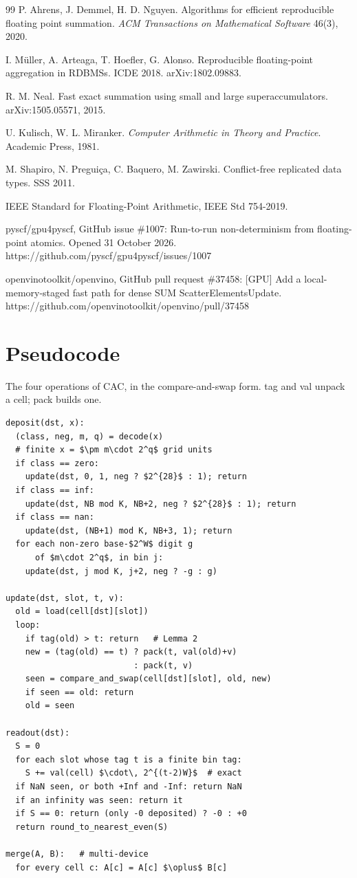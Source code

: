 \documentclass[3p,10pt]{elsarticle}
\begin{document}
\begin{thebibliography}{99}
 P. Ahrens, J. Demmel, H. D. Nguyen. Algorithms for efficient
reproducible floating point summation. \emph{ACM Transactions on
Mathematical Software} 46(3), 2020.

 I. Müller, A. Arteaga, T. Hoefler, G. Alonso. Reproducible
floating-point aggregation in RDBMSs. ICDE 2018. arXiv:1802.09883.

 R. M. Neal. Fast exact summation using small and large
superaccumulators. arXiv:1505.05571, 2015.

 U. Kulisch, W. L. Miranker. \emph{Computer Arithmetic in Theory and
Practice}. Academic Press, 1981.

 M. Shapiro, N. Preguiça, C. Baquero, M. Zawirski. Conflict-free
replicated data types. SSS 2011.

 IEEE Standard for Floating-Point Arithmetic, IEEE Std 754-2019.

 pyscf/gpu4pyscf, GitHub issue \#1007: Run-to-run non-determinism from
floating-point atomics. Opened 31 October 2026.
https://github.com/pyscf/gpu4pyscf/issues/1007

 openvinotoolkit/openvino, GitHub pull request \#37458: {[}GPU{]} Add a
local-memory-staged fast path for dense SUM ScatterElementsUpdate.
https://github.com/openvinotoolkit/openvino/pull/37458
\end{thebibliography}

\appendix

\hypertarget{pseudocode}{%
\section{Pseudocode}\label{pseudocode}}

The four operations of CAC, in the compare-and-swap form. tag and val
unpack a cell; pack builds one.

\begin{lstlisting}
deposit(dst, x):
  (class, neg, m, q) = decode(x)
  # finite x = $\pm m\cdot 2^q$ grid units
  if class == zero:
    update(dst, 0, 1, neg ? $2^{28}$ : 1); return
  if class == inf:
    update(dst, NB mod K, NB+2, neg ? $2^{28}$ : 1); return
  if class == nan:
    update(dst, (NB+1) mod K, NB+3, 1); return
  for each non-zero base-$2^W$ digit g
      of $m\cdot 2^q$, in bin j:
    update(dst, j mod K, j+2, neg ? -g : g)

update(dst, slot, t, v):
  old = load(cell[dst][slot])
  loop:
    if tag(old) > t: return   # Lemma 2
    new = (tag(old) == t) ? pack(t, val(old)+v)
                          : pack(t, v)
    seen = compare_and_swap(cell[dst][slot], old, new)
    if seen == old: return
    old = seen

readout(dst):
  S = 0
  for each slot whose tag t is a finite bin tag:
    S += val(cell) $\cdot\, 2^{(t-2)W}$  # exact
  if NaN seen, or both +Inf and -Inf: return NaN
  if an infinity was seen: return it
  if S == 0: return (only -0 deposited) ? -0 : +0
  return round_to_nearest_even(S)

merge(A, B):   # multi-device
  for every cell c: A[c] = A[c] $\oplus$ B[c]
\end{lstlisting}
\end{document}
